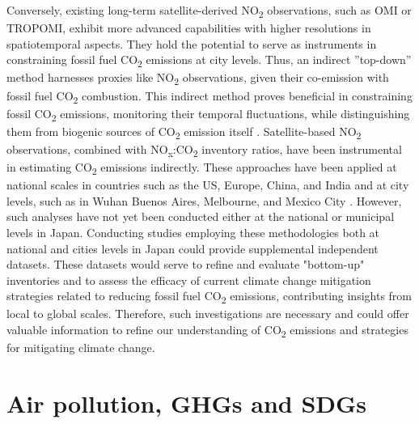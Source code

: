 Conversely, existing long-term satellite-derived NO\textsubscript{2} observations, such as OMI or TROPOMI, exhibit more advanced capabilities with higher resolutions in spatiotemporal aspects. They hold the potential to serve as instruments in constraining fossil fuel CO\textsubscript{2} emissions at city levels. Thus, an indirect ”top-down” method harnesses proxies like NO\textsubscript{2} observations, given their co-emission with fossil fuel CO\textsubscript{2} combustion. This indirect method proves beneficial in constraining fossil CO\textsubscript{2} emissions, monitoring their temporal fluctuations, while distinguishing them from biogenic sources of CO\textsubscript{2} emission itself \citep{ciais2014current, goldberg2019exploiting}. Satellite-based NO\textsubscript{2} observations, combined with NO\textsubscript{x}:CO\textsubscript{2} inventory ratios, have been instrumental in estimating CO\textsubscript{2} emissions indirectly. These approaches have been applied at national scales in countries such as the US, Europe, China, and India \citep{konovalov2016estimation, zheng2020satellite, miyazaki2023predictability} and at city levels, such as in Wuhan \citep{zhang2023quantifying} Buenos Aires, Melbourne, and Mexico City \citep{yang2023using}. However, such analyses have not yet been conducted either at the national or municipal levels in Japan. Conducting studies employing these methodologies both at national and cities levels in Japan could provide supplemental independent datasets. These datasets would serve to refine and evaluate "bottom-up" inventories and to assess the efficacy of current climate change mitigation strategies related to reducing fossil fuel CO\textsubscript{2} emissions, contributing insights from local to global scales. Therefore, such investigations are necessary and could offer valuable information to refine our understanding of CO\textsubscript{2} emissions and strategies for mitigating climate change. \par

\section{Air pollution, GHGs and SDGs}
